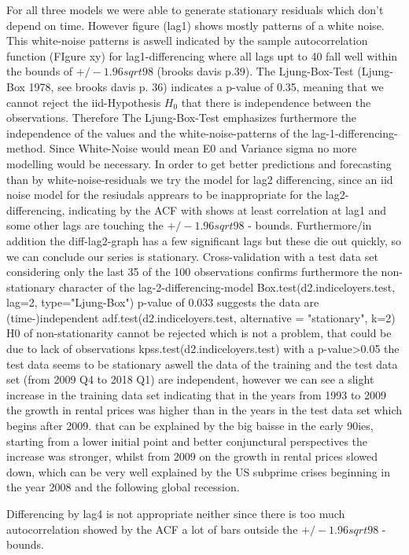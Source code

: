 \documentclass[11pt,a4paper]{article}
\begin{document}
{For all three models we were able to generate stationary residuals which don't depend on time. However figure (lag1) shows mostly patterns of a white noise. This white-noise patterns is aswell indicated by the sample autocorrelation function (FIgure xy) for lag1-differencing where all lags upt to 40 fall well within the bounds of $+/-1.96sqrt{98}$ (brooks davis p.39). The Ljung-Box-Test (Ljung-Box 1978, see brooks davis p. 36) indicates a p-value of 0.35, meaning that we cannot reject the iid-Hypothesis $H_0$ that there is independence between the observations. Therefore The Ljung-Box-Test emphasizes furthermore the independence of the values and the white-noise-patterns of the lag-1-differencing-method. Since White-Noise would mean E0 and Variance sigma no more modelling would be necessary. In order to get better predictions and forecasting than by white-noise-residuals we try the model for lag2 differencing, since an iid noise model for the resiudals apprears to be inappropriate for the lag2-differencing, indicating by the ACF with shows at least correlation at lag1 and some other lags are touching the $+/-1.96sqrt{98}$ - bounds. Furthermore/in addition the diff-lag2-graph has a few significant lags but these die out quickly, so we can conclude our series is stationary.
Cross-validation with a test data set considering only the last 35 of the 100 observations confirms furthermore the non-stationary character of the lag-2-differencing-model 
Box.test(d2.indiceloyers.test, lag=2, type="Ljung-Box") p-value of 0.033 suggests the data are (time-)independent
adf.test(d2.indiceloyers.test, alternative = "stationary", k=2)  H0 of non-stationarity cannot be rejected which is not a problem, that could be due to lack of observations
kpss.test(d2.indiceloyers.test)  with a p-value>0.05 the test data seems to be stationary aswell
the data of the training and the test data set (from 2009 Q4 to 2018 Q1) are independent, however we can see a slight increase in the training data set indicating that in the years from 1993 to 2009 the growth in rental prices was higher than in the years in the test data set which begins after 2009. that can be explained by the big baisse in the early 90ies, starting from a lower initial point and better conjunctural perspectives the increase was stronger, whilst from 2009 on the growth in rental prices slowed down, which can be very well explained by the US subprime crises beginning in the year 2008 and the following global recession.

Differencing by lag4 is not appropriate neither since there is too much autocorrelation showed by the ACF a lot of bars outside the $+/-1.96sqrt{98}$ - bounds.

}
\end{document}
